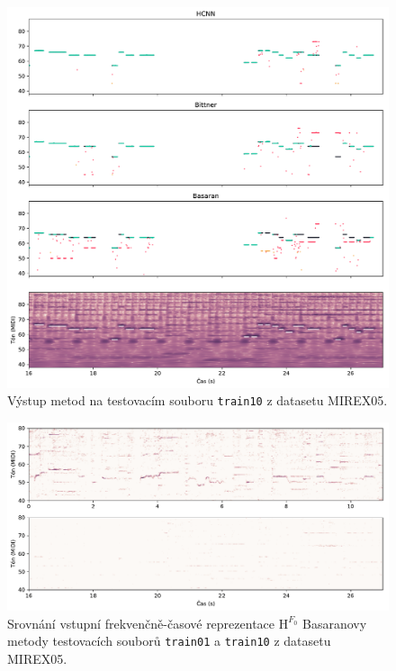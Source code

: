 \begin{figure}[h]\centering
\includegraphics[width=\textwidth,height=\textheight,keepaspectratio]{../img/vysledky/mirex05_train10}
\caption{Výstup metod na testovacím souboru \texttt{train10} z datasetu MIREX05.}
\label{obr:mirex05_train10}
\end{figure}

\begin{figure}[h]\centering
\includegraphics[width=\textwidth,height=\textheight,keepaspectratio]{../img/vysledky/basaran_salience_comparison}
\caption{Srovnání vstupní frekvenčně-časové reprezentace $\bm{\mathrm{H}}^{F_0}$ Basaranovy metody testovacích souborů \texttt{train01} a \texttt{train10} z datasetu MIREX05.}
\label{obr:basaran_salience_comparison}
\end{figure}

